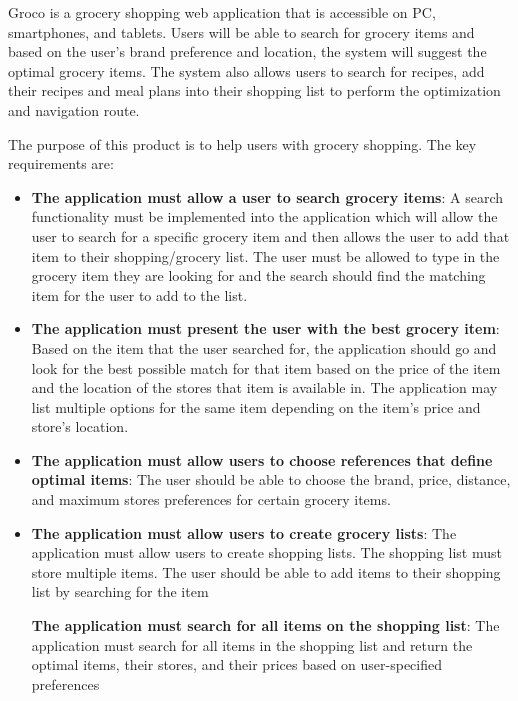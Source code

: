 Groco is a grocery shopping web application that is accessible on PC, smartphones, and tablets. Users will be able to search for grocery items and based on the user's brand preference and location, the system will suggest the optimal grocery items. The system also allows users to search for recipes, add their recipes and meal plans into their shopping list to perform the optimization and navigation route.

The purpose of this product is to help users with grocery shopping. The key requirements are:
\begin{itemize}
\item \textbf{The application must allow a user to search grocery items}: A search functionality must be implemented into the application which will allow the user to search for a specific grocery item and then allows the user to add that item to their shopping/grocery list. The user must be allowed to type in the grocery item they are looking for and the search should find the matching item for the user to add to the list.

\item \textbf{The application must present the user with the best grocery item}: Based on the item that the user searched for, the application should go and look for the best possible match for that item based on the price of the item and the location of the stores that item is available in. The application may list multiple options for the same item depending on the item's price and store's location.

\item \textbf{The application must allow users to choose references that define optimal items}: The user should be able to choose the brand, price, distance, and maximum stores preferences for certain grocery items.

\item \textbf{The application must allow users to create grocery lists}: The application must allow users to create shopping lists. The shopping list must store multiple items. The user should be able to add items to their shopping list by searching for the item

\iem \textbf{The application must search for all items on the shopping list}: The application must search for all items in the shopping list and return the optimal items, their stores, and their prices based on user-specified preferences


\end{itemize}
